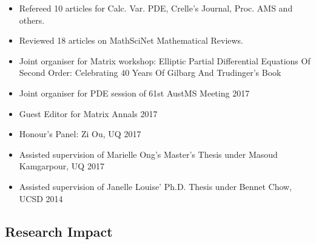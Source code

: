 \documentclass[12pt]{article}
\begin{document}
\begin{itemize}
\item Refereed 10 articles for Calc. Var. PDE, Crelle's Journal, Proc. AMS and others.
\item Reviewed 18 articles on MathSciNet Mathematical Reviews.
\item Joint organiser for Matrix workshop: Elliptic Partial Differential Equations Of Second Order: Celebrating 40 Years Of Gilbarg And Trudinger’s Book
\item Joint organiser for PDE session of 61st AustMS Meeting 2017
\item Guest Editor for Matrix Annals 2017
\item Honour's Panel: Zi Ou, UQ 2017
\item Assisted supervision of Marielle Ong's Master's Thesis under Masoud Kamgarpour, UQ 2017
\item Assisted supervision of Janelle Louise' Ph.D. Thesis under Bennet Chow, UCSD 2014
\end{itemize}

\subsection*{Research Impact}
\label{sec:orgheadline7}
\end{document}
